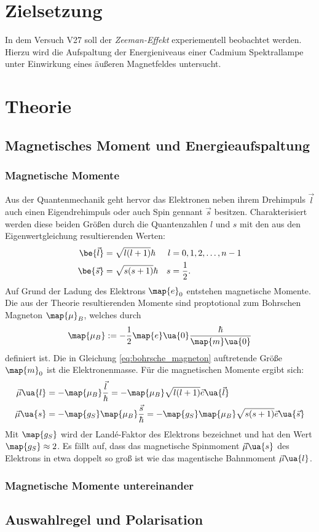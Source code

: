 \setcounter{page}{1}
\section*{Zielsetzung}
In dem Versuch V27 soll der \emph{Zeeman-Effekt} experiementell beobachtet werden.
Hierzu wird die Aufspaltung der Energieniveaus einer Cadmium Spektrallampe
unter Einwirkung eines äußeren Magnetfeldes untersucht.

\section{Theorie}

\subsection{Magnetisches Moment und Energieaufspaltung}
\subsubsection{Magnetische Momente}
Aus der Quantenmechanik geht hervor das Elektronen neben ihrem Drehimpuls $\vec{l}$ auch einen
Eigendrehimpuls oder auch Spin gennant $\vec{s}$ besitzen. Charakterisiert werden diese beiden Größen durch die
Quantenzahlen $l$ und $s$ mit den aus den Eigenwertgleichung resultierenden Werten:
\begin{align*}
\be{\vec{l}}&=\sqrt{l(l+1)}\hbar & l&=0,1,2,\dots,n-1\\
\be{\vec{s}}&=\sqrt{s(s+1)}\hbar & s&=\frac{1}{2}.
\end{align*}
Auf Grund der Ladung des Elektrons $\map{e}_0$ entstehen magnetische Momente.
Die aus der Theorie resultierenden Momente sind proptotional zum Bohrschen Magneton $\map{\mu}_B$, welches durch
\begin{equation}
  \label{eq:bohrsche_magneton}
  \map{\mu_B}:=-\frac{1}{2}\map{e}\ua{0} \frac{\hbar}{\map{m}\ua{0}}
\end{equation}
definiert ist. Die in Gleichung \eqref{eq:bohrsche_magneton} auftretende Größe $\map{m}_0$ ist die Elektronenmasse.
Für die magnetischen Momente ergibt sich:
\begin{align}
  \vec{\mu}\ua{l}&=-\map{\mu_B}\frac{\vec{l}}{\hbar}=-\map{\mu_B}\sqrt{l(l+1)}\vec{e}\ua{\vec{l}} \\
  \vec{\mu}\ua{s}&=-\map{g_S}\map{\mu_B}\frac{\vec{s}}{\hbar}=-\map{g_S}\map{\mu_B}\sqrt{s(s+1)}\vec{e}\ua{\vec{s}}
\end{align}
Mit $\map{g_S}$ wird der Landé-Faktor des Elektrons bezeichnet und hat den Wert $\map{g_S}\approx 2$.
Es fällt auf, dass das magnetische Spinmoment $\vec{\mu}\ua{s}$ des Elektrons in etwa doppelt
so groß ist wie das magentische Bahnmoment $\vec{\mu}\ua{l}$.

\subsubsection{Magnetische Momente untereinander}





\subsection{Auswahlregel und Polarisation}
